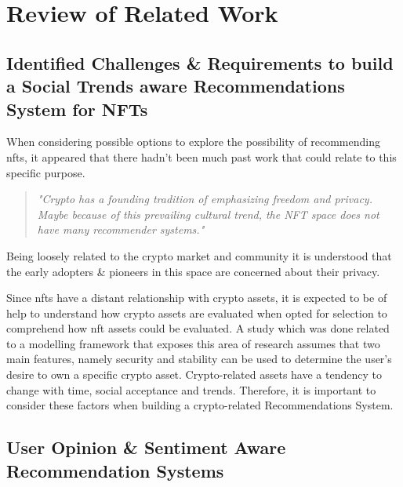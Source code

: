 \documentclass[manuscript,natbib=false]{acmart}
\begin{document}
\section{Review of Related Work}

\subsection{Identified Challenges \& Requirements to build a Social Trends aware Recommendations System for NFTs}
When considering possible options to explore the possibility of recommending \gls{nft}s, it appeared that there hadn't been much past work that could relate to this specific purpose.

\begin{quote} 
\centering 
\emph{"Crypto has a founding tradition of emphasizing freedom and privacy. Maybe because of this prevailing cultural trend, the NFT space does not have many recommender systems."} 
\\
\raggedleft
\cite{WhatAreYou2020}
\end{quote}

Being loosely related to the crypto market and community \cite{dowlingNonfungibleTokenPricing2021} it is understood that the early adopters \& pioneers in this space are concerned about their privacy. 


Since \gls{nft}s have a distant relationship with crypto assets, it is expected to be of help to understand how crypto assets are evaluated when opted for selection to comprehend how \gls{nft} assets could be evaluated. A study which was done related to a modelling framework that exposes this area of research \cite{bartolucciModelOptimalSelection2020} assumes that two main features, namely security and stability can be used to determine the user's desire to own a specific crypto asset. Crypto-related assets have a tendency to change with time, social acceptance and trends. Therefore, it is important to consider these factors when building a crypto-related Recommendations System.
 
 
\subsection{User Opinion \& Sentiment Aware Recommendation Systems}
\end{document}
